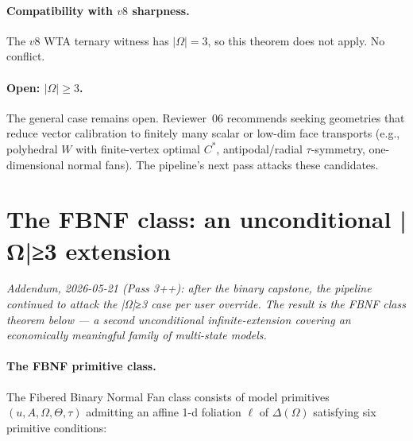\documentclass[11pt]{article}
\theoremstyle{definition}
\theoremstyle{remark}
\begin{document}
\paragraph{Compatibility with $v8$ sharpness.} The $v8$ WTA ternary
witness has $|\Omega| = 3$, so this theorem does not apply. No conflict.

\paragraph{Open: $|\Omega| \ge 3$.} The general case remains open.
Reviewer~06 recommends seeking geometries that reduce vector calibration
to finitely many scalar or low-dim face transports (e.g., polyhedral
$W$ with finite-vertex optimal $C^*$, antipodal/radial $\tau$-symmetry,
one-dimensional normal fans). The pipeline's next pass attacks these
candidates.

\section{The FBNF class: an unconditional |Ω|≥3 extension}\label{sec:fbnf}

\emph{Addendum, 2026-05-21 (Pass 3++): after the binary capstone, the
pipeline continued to attack the |Ω|≥3 case per user override. The
result is the FBNF class theorem below — a second unconditional
infinite-extension covering an economically meaningful family of
multi-state models.}

\paragraph{The FBNF primitive class.}
The Fibered Binary Normal Fan class consists of model primitives
$(u, A, \Omega, \Theta, \tau)$ admitting an affine 1-d foliation
$\ell$ of $\Delta(\Omega)$ satisfying six primitive conditions:
\end{document}
